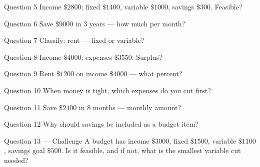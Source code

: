 \documentclass[11pt]{article}
\begin{document}
\begin{qbox}{Question 5}
Income $\$2800$; fixed $\$1400$, variable $\$1000$, savings $\$300$. Feasible?\workspace{2.4cm}
\end{qbox}

\begin{qbox}{Question 6}
Save $\$9000$ in $3$ years — how much per month?\workspace{2.4cm}
\end{qbox}

\begin{qbox}{Question 7}
Classify: rent — fixed or variable?\workspace{2.4cm}
\end{qbox}

\begin{qbox}{Question 8}
Income $\$4000$; expenses $\$3550$. Surplus?\workspace{2.4cm}
\end{qbox}

\begin{qbox}{Question 9}
Rent $\$1200$ on income $\$4000$ — what percent?\workspace{2.4cm}
\end{qbox}

\begin{qbox}{Question 10}
When money is tight, which expenses do you cut first?\workspace{2.4cm}
\end{qbox}

\begin{qbox}{Question 11}
Save $\$2400$ in $8$ months — monthly amount?\workspace{2.4cm}
\end{qbox}

\begin{qbox}{Question 12}
Why should savings be included as a budget item?\workspace{2.4cm}
\end{qbox}

\begin{qbox}{Question 13 --- Challenge}
A budget has income $\$3000$, fixed $\$1500$, variable $\$1100$, savings goal $\$500$. Is it feasible, and if not, what is the smallest variable cut needed?\workspace{3cm}
\end{qbox}

\clearpage
{}
\end{document}
